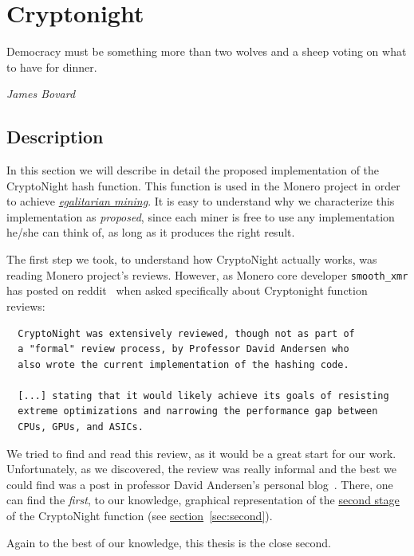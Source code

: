 
\chapter{Cryptonight} \label{ch:cryptonight}
%
\epigraph{Democracy must be something more than two wolves and a sheep voting on what to have for dinner.}{\textit{James Bovard}}
%
\section{Description}
In this section we will describe in detail the proposed implementation of the CryptoNight hash function. This function is used in the Monero project in order to achieve \hyperref[sec:egalitarian]{\emph{egalitarian mining}}. It is easy to understand why we characterize this implementation as \emph{proposed}, since each miner is free to use any implementation he/she can think of, as long as it produces the right result.

The first step we took, to understand how CryptoNight actually works, was reading Monero project's reviews. However, as Monero core developer \verb|smooth_xmr| has posted on reddit~\cite{reddit} when asked specifically about Cryptonight function reviews:
\begin{verbatim}
  CryptoNight was extensively reviewed, though not as part of
  a "formal" review process, by Professor David Andersen who
  also wrote the current implementation of the hashing code.

  [...] stating that it would likely achieve its goals of resisting
  extreme optimizations and narrowing the performance gap between
  CPUs, GPUs, and ASICs.
\end{verbatim}

We tried to find and read this review, as it would be a great start for our work. Unfortunately, as we discovered, the review was really informal and the best we could find was a post in professor David Andersen's personal blog~\cite{andersen}. There, one can find the \emph{first}, to our knowledge, graphical representation of the \hyperref[sec:second]{second stage} of the CryptoNight function (see \hyperref[sec:second]{section}~\ref{sec:second}).

Again to the best of our knowledge, this thesis is the close second.

